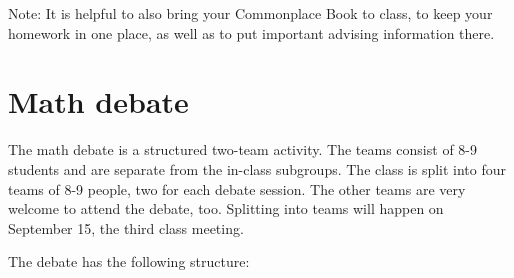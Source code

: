 \documentclass[oneside,11pt]{amsart}
\begin{document}
\medskip\noindent
Note: It is helpful to also bring your Commonplace Book to class,
to keep your homework in one place, as well as to put important
advising information there.


\section{Math debate}

The math debate is a structured two-team activity.
The teams consist of 8-9 students and are separate from the
in-class subgroups. The class is split into four teams of 8-9 people,
two for each debate session.
The other teams are very welcome to attend the debate, too.
Splitting into teams will happen on September 15, the third class meeting.

The debate has the following structure:
\end{document}
